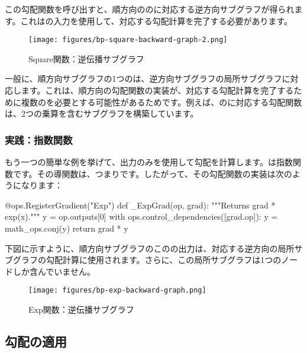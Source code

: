 \begin{content}
この勾配関数を呼び出すと、順方向ののに対応する逆方向サブグラフが得られます。これはの入力を使用して、対応する勾配計算を完了する必要があります。

\begin{figure}[!h]
\centering
\texttt{[image: figures/bp-square-backward-graph-2.png]}
\caption{Square関数：逆伝播サブグラフ}
 \label{fig:bp-square-backward-graph-2}
\end{figure}

一般に、順方向サブグラフの1つのは、逆方向サブグラフの局所サブグラフに対応します。これは、順方向の勾配関数の実装が、対応する勾配計算を完了するために複数のを必要とする可能性があるためです。例えば、のに対応する勾配関数は、2つの乗算を含むサブグラフを構築しています。

\subsubsection{実践：指数関数}

もう一つの簡単な例を挙げて、出力のみを使用して勾配を計算します。は指数関数です。その導関数は、つまりです。したがって、その勾配関数の実装は次のようになります：

\begin{leftbar}
\begin{python}
@ops.RegisterGradient("Exp")
def _ExpGrad(op, grad):
  """Returns grad * exp(x)."""
  y = op.outputs[0]
  with ops.control_dependencies([grad.op]):
    y = math_ops.conj(y)
    return grad * y
\end{python}
\end{leftbar}

下図に示すように、順方向サブグラフのこのの出力は、対応する逆方向の局所サブグラフの勾配計算に使用されます。さらに、この局所サブグラフは1つのノードしか含んでいません。

\begin{figure}[!h]
\centering
\texttt{[image: figures/bp-exp-backward-graph.png]}
\caption{Exp関数：逆伝播サブグラフ}
 \label{fig:bp-exp-backward-graph}
\end{figure}

\subsection{勾配の適用}


\end{content}
